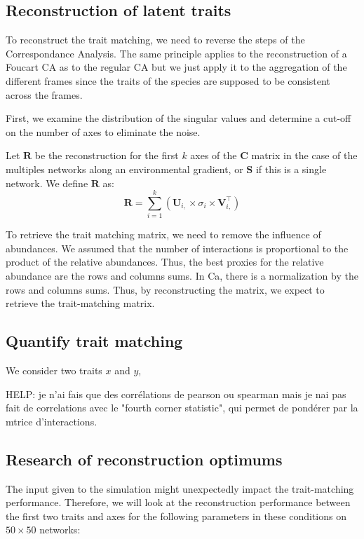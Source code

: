 \subsection{Reconstruction of latent traits}

To reconstruct the trait matching, we need to reverse the steps of the Correspondance Analysis. The same principle applies to the reconstruction of a Foucart CA as to the regular CA but we just apply it to the  aggregation of the different frames since the traits of the species are supposed to be consistent across the frames.

First, we examine the distribution of the singular values and determine a cut-off on the number of axes to eliminate the noise.

Let $\mathbf{R}$ be the reconstruction for the first $k$ axes of the $\mathbf{C}$ matrix in the case of the multiples networks along an environmental gradient, or $\mathbf{S}$ if this is a single network. We define $\mathbf{R}$ as:
$$
    \mathbf{R} = \sum_{i=1} ^{k}\left( \mathbf{U}_{i,} \times \sigma_i \times \mathbf{V}_{i,}^\intercal \right)
$$

To retrieve the trait matching matrix, we need to remove the influence of abundances. We assumed that the number of interactions is proportional to the product of the relative abundances.  Thus, the best proxies for the relative abundance are the rows and columns sums.
In Ca, there is a normalization by the rows and columns sums. Thus, by reconstructing the matrix, we expect to retrieve the trait-matching matrix.

\subsection{Quantify trait matching}

We consider two traits $x$ and $y$,

HELP: je n'ai fais que des corrélations de pearson ou spearman mais je nai pas fait de correlations avec le "fourth corner statistic", qui permet de pondérer par la mtrice d'interactions.


\subsection{Research of reconstruction optimums}

The input given to the simulation might unexpectedly impact the trait-matching performance. Therefore, we will look at the reconstruction performance between the first two traits and axes for the following parameters in these conditions on $50\times50$ networks:

